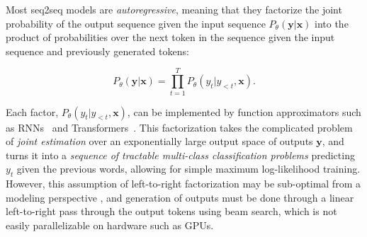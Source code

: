 \documentclass[11pt,a4paper]{article}
\begin{document}
Most seq2seq models are \emph{autoregressive}, meaning that they factorize the joint probability of the output sequence given the input sequence $P_\theta(\mathbf{y}|\mathbf{x})$ into the product of probabilities over the next token in the sequence given the input sequence and previously generated tokens:

\begin{equation}\label{eq:autoregress}
P_\theta(\mathbf{y}|\mathbf{x}) = \prod\limits_{t=1}^{T} P_\theta(y_{t} | y_{<t}, \mathbf{x}).
\end{equation}

Each factor, $P_\theta(y_{t} | y_{<t}, \mathbf{x})$, can be implemented by function approximators such as RNNs~\citep{bahdanau2014neural} and Transformers~\citep{vaswani2017attention}.
This factorization takes the complicated problem of \emph{joint estimation} over an exponentially large output space of outputs $\mathbf{y}$, and turns it into a \emph{sequence of tractable multi-class classification problems} predicting $y_t$ given the previous words, allowing for simple maximum log-likelihood training.
However, this assumption of left-to-right factorization may be sub-optimal from a modeling perspective \cite{gu2019insertion,stern2019insertion}, and generation of outputs must be done through a linear left-to-right pass through the output tokens using beam search, which is not easily parallelizable on hardware such as GPUs.
\end{document}
